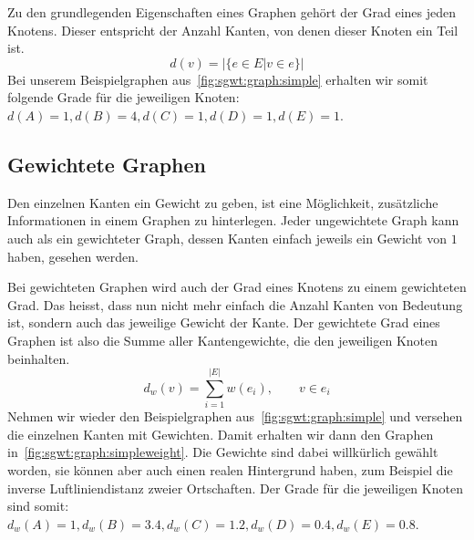 Zu den grundlegenden Eigenschaften eines Graphen geh\"ort der Grad eines jeden 
Knotens. Dieser entspricht der Anzahl Kanten, von denen dieser Knoten ein 
Teil ist.
\begin{equation*}
    d(v) = | \{e \in E | v \in e \} |
\end{equation*}
Bei unserem Beispielgraphen aus~\cref{fig:sgwt:graph:simple} 
erhalten wir somit folgende Grade f\"ur die jeweiligen Knoten: $d(A) = 1, d(B) 
= 4, d(C) = 1, d(D) = 1, d(E) = 1$.

\subsection{Gewichtete Graphen}

Den einzelnen Kanten ein Gewicht zu geben, ist eine M\"oglichkeit, 
zus\"atzliche Informationen in einem Graphen zu hinterlegen. Jeder ungewichtete 
Graph kann auch als ein gewichteter Graph, dessen Kanten einfach jeweils ein 
Gewicht von $1$ haben, gesehen werden.

Bei gewichteten Graphen wird auch der Grad eines Knotens zu einem gewichteten 
Grad. Das heisst, dass nun nicht mehr einfach die Anzahl Kanten von Bedeutung 
ist, sondern auch das jeweilige Gewicht der Kante. Der gewichtete Grad eines 
Graphen ist also die Summe aller Kantengewichte, die den jeweiligen Knoten 
beinhalten. 
\begin{equation*}
    d_w(v) = \sum_{i = 1}^{|E|}w(e_i), \qquad v \in e_i
\end{equation*}
Nehmen wir wieder den Beispielgraphen aus~\cref{fig:sgwt:graph:simple} und 
versehen die einzelnen Kanten mit Gewichten. Damit erhalten wir dann den 
Graphen in~\cref{fig:sgwt:graph:simpleweight}. Die Gewichte sind dabei 
willk\"urlich gew\"ahlt worden, sie k\"onnen aber auch einen realen Hintergrund 
haben, zum Beispiel die inverse Luftliniendistanz zweier Ortschaften. Der Grade 
f\"ur die jeweiligen Knoten sind somit: $d_w(A) = 1, d_w(B) = 3.4, d_w(C) = 
1.2, d_w(D) = 0.4, d_w(E) = 0.8$.


